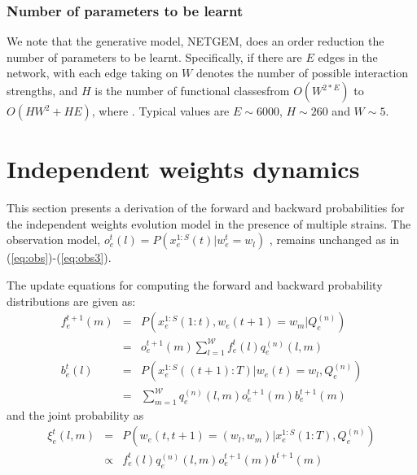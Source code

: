 \documentclass[11pt]{article}
\begin{document}
\subsubsection{Number of parameters to be learnt}
\label{sec:parameter-reduction}
We note that the generative model, NETGEM, does an order reduction the number of
parameters to be learnt. Specifically, if there are  $E$  edges in the
network, with each edge taking on  $W$ denotes the
number of possible interaction strengths, and $H$ is the number of
functional classesfrom $O(W^{2*E})$ to $O(H W^{2} + H E )$,
where . Typical values are $E \sim 6000$, $H \sim 260$
and $W\sim 5$.

\section{Independent weights dynamics}
\label{sec:fact-model-deriv}
This section presents a derivation of the forward and backward
probabilities for the independent weights evolution model in the
presence of multiple strains. The observation model,
$o^t_e(l)=P(x^{1:S}_e(t) | w^t_e=w_l)$ , remains unchanged as in (\ref{eq:obs})-(\ref{eq:obs3}). 

The update equations for computing the forward and backward
probability distributions are given as:
\begin{eqnarray}
  \label{eq:update}
  f^{t+1}_{e}(m) &=& P(x_{e}^{1:S}(1:t) , w_{e}(t+1) = w_{m} | Q^{(n)}_{e}) \\
&=& o^{t+1}_{e}(m) \sum_{l=1}^{{\mathcal W}} f_{e}^{t}(l) q_{e}^{(n)}(l, m) \\
  b^{t}_{e}(l) &=& P(x^{1:S}_{e}((t+1):T) | w_{e}(t) = w_{l},
  Q^{(n)}_{e})  \\
\label{eq:update-1}
&=& \sum_{m=1}^{{\mathcal W}} q_{e}^{(n)}(l, m) o^{t+1}_{e}(m) b^{t+1}_{e}(m)
\end{eqnarray}
and the joint probability as
\begin{eqnarray}
  \label{eq:p-joint}
  \xi_{e}^{t}(l,m) &=& P(w_{e}(t,t+1) =(w_{l}, w_{m}) |
  x^{1:S}_{e}(1:T), Q^{(n)}_{e}) \\
&\propto& f_{e}^{t}(l) q_{e}^{(n)}(l, m) o_{e}^{t+1}(m) b^{t+1}(m) 
\end{eqnarray}
\end{document}
